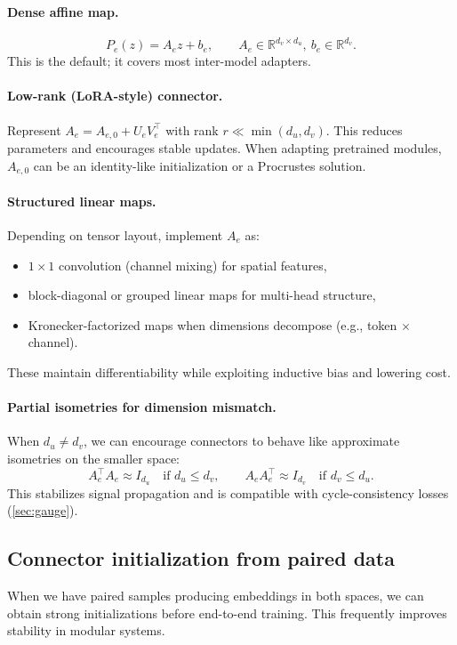 \documentclass[11pt]{article}
\theoremstyle{definition}
\theoremstyle{plain}
\theoremstyle{remark}
\newcommand{\R}{\mathbb{R}}
\begin{document}
\paragraph{Dense affine map.}
\[
P_e(z)=A_e z + b_e,\qquad A_e\in \R^{d_v\times d_u},\ b_e\in\R^{d_v}.
\]
This is the default; it covers most inter-model adapters.

\paragraph{Low-rank (LoRA-style) connector.}
Represent $A_e = A_{e,0}+U_e V_e^\top$ with rank $r\ll \min(d_u,d_v)$.
This reduces parameters and encourages stable updates.
When adapting pretrained modules, $A_{e,0}$ can be an identity-like initialization or a Procrustes solution.

\paragraph{Structured linear maps.}
Depending on tensor layout, implement $A_e$ as:
\begin{itemize}[leftmargin=2em]
\item $1\times 1$ convolution (channel mixing) for spatial features,
\item block-diagonal or grouped linear maps for multi-head structure,
\item Kronecker-factorized maps when dimensions decompose (e.g., token $\times$ channel).
\end{itemize}
These maintain differentiability while exploiting inductive bias and lowering cost.

\paragraph{Partial isometries for dimension mismatch.}
When $d_u\neq d_v$, we can encourage connectors to behave like approximate isometries on the smaller space:
\[
A_e^\top A_e \approx I_{d_u}\quad\text{if }d_u\le d_v,
\qquad
A_e A_e^\top \approx I_{d_v}\quad\text{if }d_v\le d_u.
\]
This stabilizes signal propagation and is compatible with cycle-consistency losses (\cref{sec:gauge}).

\subsection{Connector initialization from paired data}
\label{sec:connector-init}

When we have paired samples producing embeddings in both spaces, we can obtain strong initializations before end-to-end training.
This frequently improves stability in modular systems.
\end{document}

